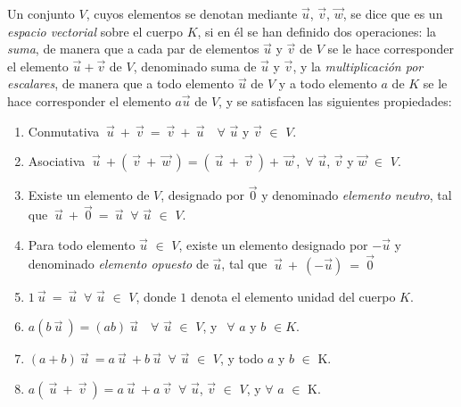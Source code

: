 \begin{definition}
    {Un conjunto $V$, cuyos elementos se denotan mediante $\vec{u}$, $\vec{v}$, $\vec{w}$, se dice que es un \textit{espacio vectorial} sobre el cuerpo $K$, si en él se han definido dos operaciones: la \textit{suma}, de manera que a cada par de elementos $\vec{u}$ y $\vec{v}$ de $V$ se le hace corresponder el elemento $\vec{u}+\vec{v}$ de $V$, denominado suma de $\vec{u}$ y $\vec{v}$, y la \textit{multiplicación por escalares}, de manera que a todo elemento $\vec{u}$ de $V$  y a todo elemento $a$ de $K$ se le hace corresponder el elemento $a\vec{u}$ de $V$, y se satisfacen las siguientes propiedades:

\bigskip


\begin{enumerate}


\item Conmutativa $~\vec{u}~ + ~\vec{v}~ = ~\vec{v}~ + ~\vec{u}~$ $~~\forall$ $\vec{u}$ y $\vec{v}$ $\in$ $V$.

\item Asociativa $~\vec{u}~ + (~\vec{v}~+  ~\vec{w}~)= (~\vec{u}~+  ~\vec{v}~) + ~\vec{w}~$,$~~\forall$ $\vec{u}$,  $\vec{v}$ y $\vec{w}$  $\in$ $V$. 
\item Existe un elemento de $V$, designado por $\vec{0}$ y denominado \textit{elemento neutro}, tal que 
$~\vec{u}~ + ~\vec{0}~ = ~\vec{u}~$ $\forall$ $\vec{u}$ $\in$ $V$.

\item Para todo elemento $\vec{u}$ $\in$ $V$, existe un elemento designado por $-\vec{u}$ y denominado \textit{elemento opuesto} de $\vec{u}$, tal que 
$~\vec{u}~ + ~(-\vec{u})~ = ~\vec{0}$

\item $1~\vec{u}~ =~\vec{u}~$ $\forall$ $\vec{u}$ $\in$ $V$, donde $1$ denota el elemento unidad del cuerpo  $K$. 

\item $a(b~\vec{u}~) =(ab)~\vec{u}~$ $~~\forall$ $\vec{u}$ $\in$ $V$, y $~~\forall$ $a$ y $b$ $  \in K$.
\item $(a+b)~\vec{u}~ =a~\vec{u}~+b~\vec{u}~ $ $\forall$ $\vec{u}$ $\in$ $V$, y todo $a$ y $b$ $\in$ K.
\item $a(~\vec{u}~+~\vec{v}~) =a~\vec{u}~+a~\vec{v}~ $ $\forall$ $\vec{u}$, $\vec{v}$ $\in$ $V$, y $\forall$ $a$ $\in$ K.

\end{enumerate}}
\end{definition}

